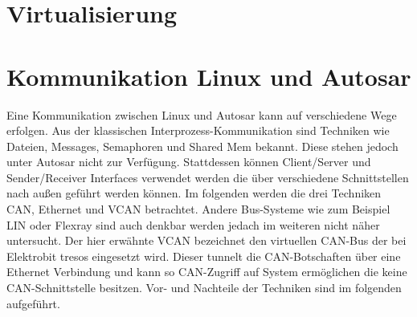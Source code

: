 \documentclass[
  a4paper,					    %
  twoside,
  DIV=calc,     				%
  bibliography=totoc,
  cleardoublepage=empty,
  ngerman,     					%
  final       					%
]{scrbook}
\begin{document}
\section{Virtualisierung}
\label{sec:Virtualisierung_Umgesetzt}






\section{Kommunikation Linux und Autosar}
\label{sec:Kommunikation_L_A}
Eine Kommunikation zwischen Linux und Autosar kann auf verschiedene Wege erfolgen. Aus der klassischen Interprozess-Kommunikation sind Techniken wie Dateien, Messages, Semaphoren und Shared Mem bekannt. Diese stehen jedoch unter Autosar nicht zur Verfügung. Stattdessen können Client/Server und Sender/Receiver Interfaces verwendet werden die über verschiedene Schnittstellen nach außen geführt werden können. Im folgenden werden die drei Techniken CAN, Ethernet und VCAN betrachtet. Andere Bus-Systeme wie zum Beispiel LIN oder Flexray sind auch denkbar werden jedach im weiteren nicht näher untersucht. Der hier erwähnte VCAN bezeichnet den virtuellen CAN-Bus der bei Elektrobit tresos eingesetzt wird. Dieser tunnelt die CAN-Botschaften über eine Ethernet Verbindung und kann so CAN-Zugriff auf System ermöglichen die keine CAN-Schnittstelle besitzen. Vor- und Nachteile der Techniken sind im folgenden aufgeführt.
\end{document}
